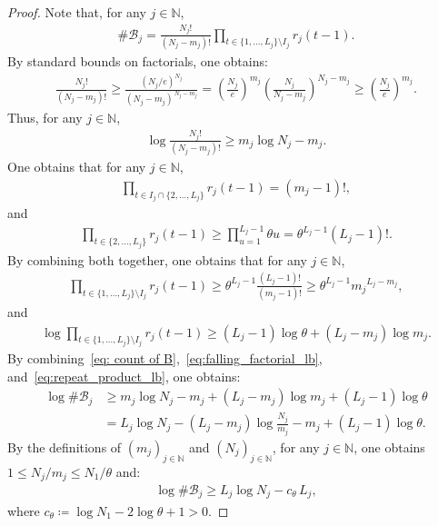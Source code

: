 \documentclass[12pt,reqno]{amsart}
\theoremstyle{definition}
\theoremstyle{plain}
\begin{document}
\begin{proof}
Note that, for any $j\in\mathbb{N}$, 
\begin{align}
\label{eq: count of B}
    \#\mathcal{B}_j =
    \frac{N_j!}{(N_j-m_j)!}\prod_{t\in \{1,\ldots,L_j\}\setminus{I_j}}r_j(t-1).
\end{align}
By standard bounds on factorials, one obtains:
\begin{align*}
    \frac{N_j!}{(N_j-m_j)!}
    \geq \frac{(N_j/e)^{N_j}}{(N_j-m_j)^{\,N_j-m_j}}
    = \left(\frac{N_j}{e}\right)^{m_j}\left(\frac{N_j}{N_j-m_j}\right)^{N_j-m_j}
    \geq \left(\frac{N_j}{e}\right)^{m_j}.
\end{align*}
Thus, for any $j\in\mathbb{N}$,
\begin{align}\label{eq:falling_factorial_lb}
    \log{\frac{N_j!}{(N_j-m_j)!}}\geq m_j\log N_j - m_j.
\end{align}
One obtains that for any $j\in\mathbb{N}$, 
\begin{align*}
    \prod_{t\in I_j\cap{\{2,\ldots,L_j\}}} r_j(t-1)=(m_j-1)!,
\end{align*}
and
\begin{align*}
    \prod_{t\in\{2,\ldots,L_j\}}r_j(t-1)\geq \prod_{u=1}^{L_j-1}\theta u=\theta^{L_j-1}(L_j-1)!.
\end{align*}
By combining both together, one obtains that for any $j\in\mathbb{N}$, 
\begin{align*}
    \prod_{t\in\{1,\ldots,L_j\}\setminus{I_j}} r_j(t-1)
    \geq \theta^{L_j-1}\frac{(L_j-1)!}{(m_j-1)!}
    \geq\theta^{L_j-1}{m_j}^{L_j-m_j},
\end{align*}
and
\begin{align}
\label{eq:repeat_product_lb}
    \log{\prod_{t\in\{1,\ldots,L_j\}\setminus{I_j}} r_j(t-1)}
    \geq (L_j-1)\log{\theta}+(L_j-m_j)\log{m_j}.
\end{align}
By combining~\eqref{eq: count of B},~\eqref{eq:falling_factorial_lb}, and~\eqref{eq:repeat_product_lb}, one obtains:
\begin{align*}
    \log{\#\mathcal{B}_j}
    &\geq
    m_j\log N_j - m_j  + (L_j-m_j)\log{m_j}+(L_j-1)\log{\theta} \\
    &= L_j\log{N_j}-(L_j-m_j)\log{\frac{N_j}{m_j}}-m_j+(L_j-1)\log{\theta}
    .
\end{align*}
By the definitions of $(m_j)_{j\in\mathbb{N}}$ and $(N_j)_{j\in\mathbb{N}}$, for any $j\in\mathbb{N}$, one obtains $1\leq{N_j}/{m_j}\leq N_1/\theta$ and:
\begin{align}
\label{eq: log Bjlower}
    \log{\#\mathcal{B}_j}\geq L_j\log{N_j}-c_\theta \,L_j,
\end{align}
where $c_\theta \coloneqq \log{N_1}-2\log{\theta}+1>0$.


\end{proof}
\end{document}
